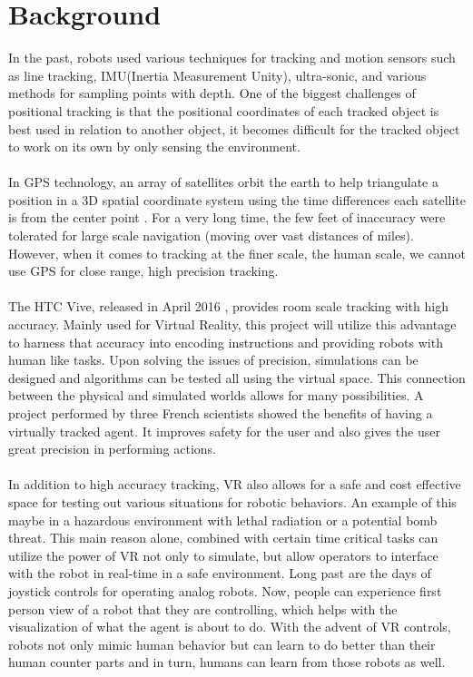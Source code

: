 \documentclass[10pt,a4paper]{article}
\begin{document}
	\section*{Background}
	In the past, robots used various techniques for tracking and motion sensors such as line tracking, IMU(Inertia Measurement Unity), ultra-sonic, and various methods for sampling points with depth. One of the biggest challenges of positional tracking is that the positional coordinates of each tracked object is best used in relation to another object, it becomes difficult for the tracked object to work on its own by only sensing the environment.
	\\\\
	In GPS technology, an array of satellites orbit the earth to help triangulate a position in a 3D spatial coordinate system using the time differences each satellite is from the center point \cite{gizmodo1}. For a very long time, the few feet of inaccuracy were tolerated for large scale navigation (moving over vast distances of miles). However, when it comes to tracking at the finer scale, the human scale, we cannot use GPS for close range, high precision tracking.
	\\\\
	The HTC Vive, released in April 2016 \cite{techradar1}, provides room scale tracking with high accuracy. Mainly used for Virtual Reality, this project will utilize this advantage to harness that accuracy into encoding instructions and providing robots with human like tasks. Upon solving the issues of precision, simulations can be designed and algorithms can be tested all using the virtual space. This connection between the physical and simulated worlds allows for many possibilities. A project performed by three French scientists showed the benefits of having a virtually tracked agent. It improves safety for the user and also gives the user great precision in performing actions\cite{Frenchmen}.
	\\\\
	In addition to high accuracy tracking, VR also allows for a safe and cost effective space for testing out various situations for robotic behaviors. An example of this maybe in a hazardous environment\cite{Bugalia} with lethal radiation or a potential bomb threat\cite{Codd-Downey}. This main reason alone, combined with certain time critical tasks can utilize the power of VR not only to simulate, but allow operators to interface with the robot in real-time in a safe environment. Long past are the days of joystick controls for operating analog robots. Now, people can experience first person view of a robot that they are controlling, which helps with the visualization of what the agent is about to do\cite{Livatino-Privitera}. With the advent of VR controls, robots not only mimic human behavior but can learn to do better than their human counter parts and in turn, humans can learn from those robots as well.
	
\end{document}
